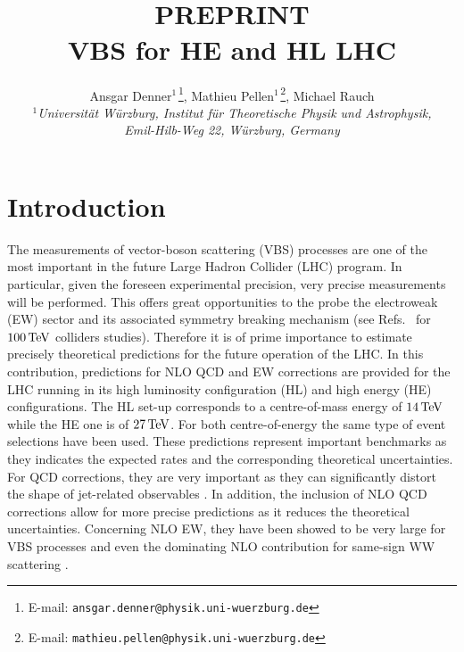 \documentclass[11pt,epsf]{article}
\begin{document}
\title{\hfill ~\\[-30mm]
\phantom{h} \hfill\mbox{\small PREPRINT}
\\[1cm]
\vspace{13mm}   \textbf{VBS for HE and HL LHC}}

\date{}
\author{
Ansgar Denner$^{1\,}$\footnote{E-mail:
  \texttt{ansgar.denner@physik.uni-wuerzburg.de}},
Mathieu Pellen$^{1\,}$\footnote{E-mail:
  \texttt{mathieu.pellen@physik.uni-wuerzburg.de}},
Michael Rauch
\\[9mm]
{\small\it
$^1$Universit\"at W\"urzburg, %
        Institut f\"ur Theoretische Physik und Astrophysik,} \\ %
{\small\it Emil-Hilb-Weg 22,  W\"urzburg, %
        Germany}\\[3mm]
}

\maketitle

\begin{abstract}
\noindent

\end{abstract}
\thispagestyle{empty}
\vfill
\newpage
\setcounter{page}{1}

\tableofcontents
\newpage


\section{Introduction}

The measurements of vector-boson scattering (VBS) processes are one of the most important in the future Large Hadron Collider (LHC) program.
In particular, given the foreseen experimental precision, very precise measurements will be performed.
This offers great opportunities to the probe the electroweak (EW) sector and its associated symmetry breaking mechanism
(see Refs.~\cite{Mangano:2016jyj,Goncalves:2017gzy,Jager:2017owh} for $100\,\text{TeV}$ colliders studies).
Therefore it is of prime importance to estimate precisely theoretical predictions for the future operation of the LHC.
In this contribution, predictions for NLO QCD and EW corrections are provided for the LHC running in its high luminosity configuration (HL) and high energy (HE) configurations.
The HL set-up corresponds to a centre-of-mass energy of $14\,\text{TeV}$ while the HE one is of $27\,\text{TeV}$.
For both centre-of-energy the same type of event selections have been used.
These predictions represent important benchmarks as they indicates the expected rates and the corresponding theoretical uncertainties.
For QCD corrections, they are very important as they can significantly distort the shape of jet-related observables \cite{Jager:2006zc,Jager:2006cp,Bozzi:2007ur,Jager:2009xx,Jager:2011ms,Denner:2012dz,Rauch:2016pai,Biedermann:2017bss,Ballestrero:2018anz}.
In addition, the inclusion of NLO QCD corrections allow for more precise predictions as it reduces the theoretical uncertainties.
Concerning NLO EW, they have been showed to be very large for VBS processes \cite{Biedermann:2016yds} and even the dominating NLO contribution for same-sign WW scattering \cite{Biedermann:2017bss}.
\end{document}
